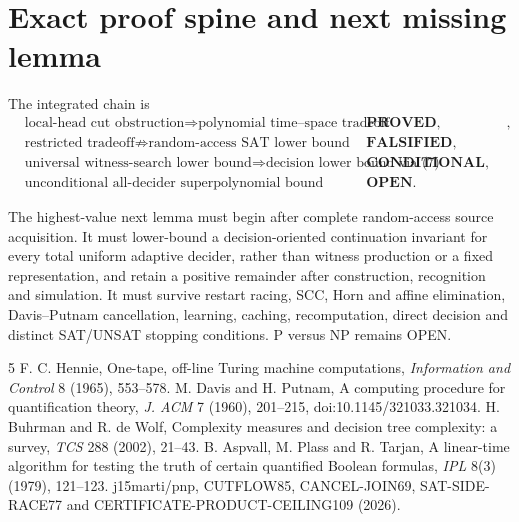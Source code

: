 \documentclass[11pt]{article}
\begin{document}
\section{Exact proof spine and next missing lemma}
The integrated chain is
\begin{align*}
&\text{local-head cut obstruction}
\Longrightarrow \text{polynomial time--space tradeoff}
&&\textbf{PROVED, restricted},\\
&\text{restricted tradeoff}
\not\Longrightarrow \text{random-access SAT lower bound}
&&\textbf{FALSIFIED},\\
&\text{universal witness-search lower bound}
\Longrightarrow \text{decision lower bound via (7)}
&&\textbf{CONDITIONAL},\\
&\text{unconditional all-decider superpolynomial bound}
&&\textbf{OPEN}.
\end{align*}

The highest-value next lemma must begin after complete random-access source
acquisition.  It must lower-bound a decision-oriented continuation invariant
for every total uniform adaptive decider, rather than witness production or a
fixed representation, and retain a positive remainder after construction,
recognition and simulation.  It must survive restart racing, SCC, Horn and
affine elimination, Davis--Putnam cancellation, learning, caching,
recomputation, direct decision and distinct SAT/UNSAT stopping conditions.
P versus NP remains OPEN.

\begin{thebibliography}{5}
 F. C. Hennie, One-tape, off-line Turing machine
computations, \emph{Information and Control} 8 (1965), 553--578.
 M. Davis and H. Putnam, A computing procedure for
quantification theory, \emph{J. ACM} 7 (1960), 201--215,
doi:10.1145/321033.321034.
 H. Buhrman and R. de Wolf, Complexity measures and decision
tree complexity: a survey, \emph{TCS} 288 (2002), 21--43.
 B. Aspvall, M. Plass and R. Tarjan, A linear-time algorithm
for testing the truth of certain quantified Boolean formulas,
\emph{IPL} 8(3) (1979), 121--123.
 j15marti/pnp, CUTFLOW85, CANCEL-JOIN69,
SAT-SIDE-RACE77 and CERTIFICATE-PRODUCT-CEILING109 (2026).
\end{thebibliography}
\end{document}
